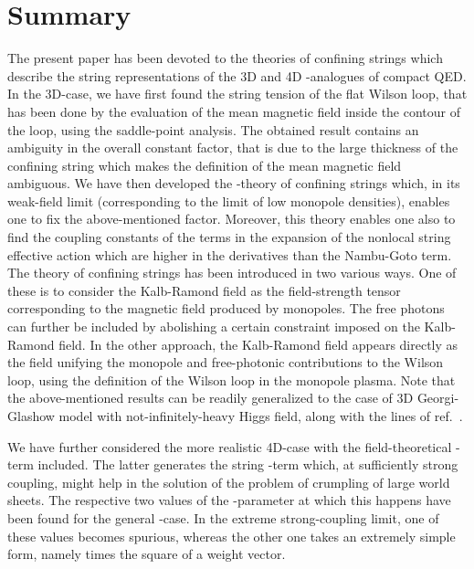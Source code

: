 \documentclass[a4paper,12pt]{article}
\begin{document}
\section{Summary}
The present paper has been devoted to the theories of confining strings which describe the string representations
of the 3D and 4D \coordHE{}-analogues of compact QED. In the 3D-case, we have first found the string tension of the flat Wilson loop,
that has been done by the evaluation of the mean magnetic field inside the contour of the loop, using the saddle-point analysis.
The obtained result contains an ambiguity in the overall constant factor, that is due to the large thickness of the confining string
which makes the definition of the mean magnetic field ambiguous. We have then developed the \coordHE{}-theory of confining strings
which, in its weak-field limit (corresponding to the limit of low monopole densities), enables one to fix the above-mentioned
factor. Moreover, this theory enables one also to find the coupling constants of the terms in the expansion of the nonlocal string
effective action which are higher in the derivatives than the Nambu-Goto term. The theory of confining strings has been introduced
in two various ways. One of these is to consider the Kalb-Ramond field as the field-strength tensor corresponding to the magnetic field
produced by monopoles. The free photons can further be included by abolishing a certain constraint imposed on the Kalb-Ramond field.
In the other approach, the Kalb-Ramond field appears directly as the field
unifying the monopole and free-photonic contributions to the Wilson loop, using the definition of the Wilson loop in the monopole plasma.
Note that the above-mentioned results can be readily generalized to the case of 3D Georgi-Glashow model with not-infinitely-heavy
Higgs field, along with the lines of ref.~\cite{mpla}.

We have further considered the more realistic 4D-case with the field-theoretical
\myHighlight{$\theta$}\coordHE{}-term included. The latter generates the string \myHighlight{$\theta$}\coordHE{}-term which, at sufficiently strong coupling, might help in the solution
of the problem of crumpling of large world sheets. The respective two values of the \myHighlight{$\theta$}\coordHE{}-parameter at which this happens
have been found for the general \coordHE{}-case. In the extreme strong-coupling limit, one of these values becomes spurious, whereas the
other one takes an extremely simple form, namely \myHighlight{$\pi$}\coordHE{} times the square of a weight vector.
\end{document}
